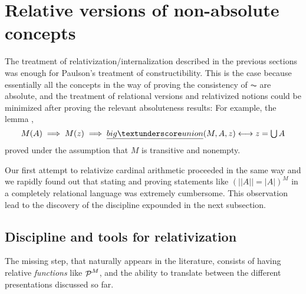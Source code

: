 \section{Relative versions of non-absolute concepts}
\label{sec:relat-vers-non-absol}

The treatment of relativization/internalization described in the
previous sections was enough for Paulson's treatment of
constructibility. This is the case because essentially all the
concepts in the way of proving the consistency of $\AC$ are
absolute, and the treatment of relational versions and relativized notions
could be minimized after proving the relevant absoluteness results:
For example, the lemma ,
\[
  M(A) \implies M(z) \implies \isa{big{\uscore}union}(M, A, z) \longleftrightarrow z = \union
  A
\]
proved under the assumption that $M$ is transitive and nonempty.

Our first attempt to relativize cardinal arithmetic proceeded in the
same way
and we rapidly found out that stating and proving statements like $(||A||
= |A|) ^M$ in a completely relational language was extremely
cumbersome. This observation lead to the discovery of the discipline
expounded in the next subsection.


\subsection{Discipline and tools for relativization}
\label{sec:tools-relativization}
The missing step, that naturally appears in the literature, consists
of having relative \emph{functions} like $\mathop{\mathcal{P}}^M$, and the ability to
translate between the different presentations discussed so far.

